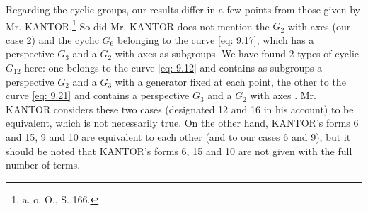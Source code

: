 \documentclass[leqno]{article}
\begin{document}
Regarding the cyclic groups, our results differ in a few points from those given by Mr. KANTOR.\footnote{a. o. O., S. 166.} So did Mr. KANTOR does not mention the $G_2$ \guillemotright with axes \guillemotright (our case 2) and the cyclic $G_6$ belonging to the curve \eqref{eq: 9.17}, which has a perspective $G_3$ and a $G_2$ \guillemotright with axes \guillemotright as subgroups. We have found 2 types of cyclic $G_{12}$ here: one belongs to the curve \eqref{eq: 9.12} and contains as subgroups a perspective $G_2$ and a $G_3$ with a generator fixed at each point, the other to the curve \eqref{eq: 9.21} and contains a perspective $G_3$ and a $G_2$ \guillemotright with axes \guillemotright. Mr. KANTOR considers these two cases (designated 12 and 16 in his account) to be equivalent, which is not necessarily true. On the other hand, KANTOR's forms 6 and 15, 9 and 10 are equivalent to each other (and to our cases 6 and 9), but it should be noted that KANTOR's forms 6, 15 and 10 are not given with the full number of terms. 
\end{document}
